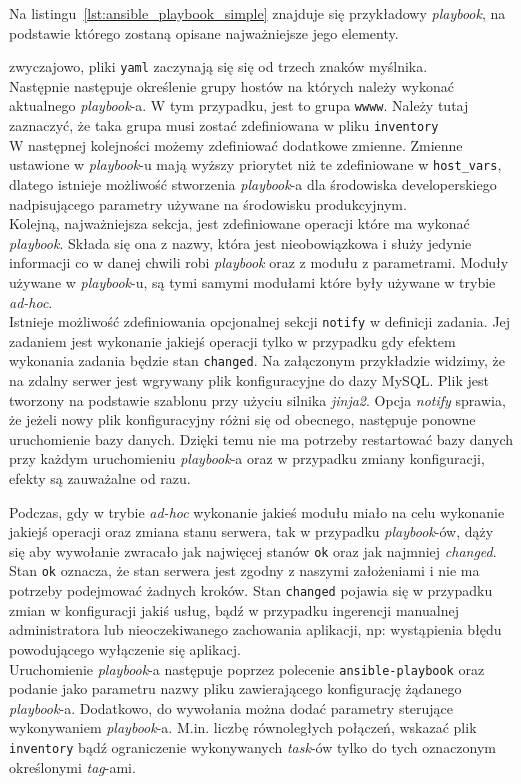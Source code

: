 Na listingu~\ref{lst:ansible_playbook_simple} znajduje się przykładowy \textit{playbook}, na podstawie którego zostaną opisane najważniejsze jego elementy.

zwyczajowo, pliki \texttt{yaml} zaczynają się się od trzech znaków myślnika.\\
Następnie następuje określenie grupy hostów na których należy wykonać aktualnego \textit{playbook}-a.
W tym przypadku, jest to grupa \texttt{wwww}.
Należy tutaj zaznaczyć, że taka grupa musi zostać zdefiniowana w pliku \texttt{inventory}\\
W następnej kolejności możemy zdefiniować dodatkowe zmienne.
Zmienne ustawione w \textit{playbook}-u mają wyższy priorytet niż te zdefiniowane w \texttt{host\_vars}, dlatego istnieje możliwość stworzenia \textit{playbook}-a dla środowiska developerskiego nadpisującego parametry używane na środowisku produkcyjnym.\\
Kolejną, najważniejsza sekcja, jest zdefiniowane operacji które ma wykonać \textit{playbook}.
Składa się ona z nazwy, która jest nieobowiązkowa i służy jedynie informacji co w danej chwili robi \textit{playbook} oraz z modułu z parametrami.
Moduły używane w \textit{playbook}-u, są tymi samymi modułami które były używane w trybie \textit{ad-hoc}.\\
Istnieje możliwość zdefiniowania opcjonalnej sekcji \texttt{notify} w definicji zadania. Jej zadaniem jest wykonanie jakiejś operacji tylko w przypadku gdy efektem wykonania zadania będzie stan \texttt{changed}.
Na załączonym przykładzie widzimy, że na zdalny serwer jest wgrywany plik konfiguracyjne do dazy MySQL.
Plik jest tworzony na podstawie szablonu przy użyciu silnika \textit{jinja2}.
Opcja \textit{notify} sprawia, że jeżeli nowy plik konfiguracyjny różni się od obecnego, następuje ponowne uruchomienie bazy danych.
Dzięki temu nie ma potrzeby restartować bazy danych przy każdym uruchomieniu \textit{playbook}-a oraz w przypadku zmiany konfiguracji, efekty są zauważalne od razu.

Podczas, gdy w trybie \textit{ad-hoc} wykonanie jakieś modułu miało na celu wykonanie jakiejś operacji oraz zmiana stanu serwera, tak w przypadku \textit{playbook}-ów, dąży się aby wywołanie zwracało jak najwięcej stanów \texttt{ok} oraz jak najmniej \textit{changed}.
Stan \texttt{ok} oznacza, że stan serwera jest zgodny z naszymi założeniami i nie ma potrzeby podejmować żadnych kroków.
Stan \texttt{changed} pojawia się w przypadku zmian w konfiguracji jakiś usług, bądź w przypadku ingerencji manualnej administratora lub nieoczekiwanego zachowania aplikacji, np: wystąpienia błędu powodującego wyłączenie się aplikacj.\\
Uruchomienie \textit{playbook}-a następuje poprzez polecenie \texttt{ansible-playbook} oraz podanie jako parametru nazwy pliku zawierającego konfigurację żądanego \textit{playbook}-a.
Dodatkowo, do wywołania można dodać parametry sterujące wykonywaniem \textit{playbook}-a. M.in. liczbę równoległych połączeń, wskazać plik \texttt{inventory} bądź ograniczenie wykonywanych \textit{task}-ów tylko do tych oznaczonym określonymi \textit{tag}-ami.
